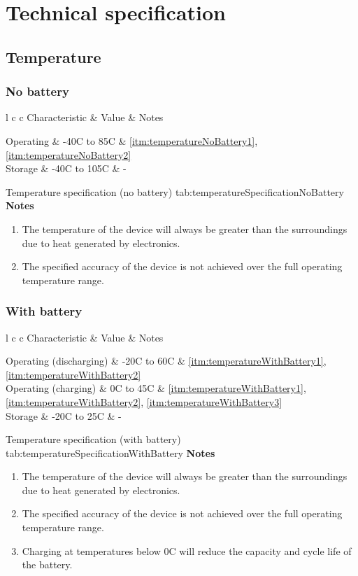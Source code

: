 \section{Technical specification}

\newcommand{\characteristicTable}[4]{
    \customTable
    {l c c}
    {Characteristic & Value & Notes}
    {
        #1
    }
    {#2}
    {#3}
    \textbf{Notes}
    \begin{enumerate}[nolistsep]
        #4
    \end{enumerate}
}

\subsection{Temperature}
\label{sec:temperature}

\newcommand{\noteHeatGenerated}{The temperature of the device will always be greater than the surroundings due to heat generated by electronics.}

\newcommand{\noteCalibrationTemperature}{The specified accuracy of the device is not achieved over the full operating temperature range.}%

\subsubsection{No battery}

\characteristicTable
{
    Operating & -40\textdegree{}C to 85\textdegree{}C & \ref{itm:temperatureNoBattery1}, \ref{itm:temperatureNoBattery2}\\
    Storage & -40\textdegree{}C to 105\textdegree{}C & -\\
}
{Temperature specification (no battery)}
{tab:temperatureSpecificationNoBattery}
{
    \item \label{itm:temperatureNoBattery1} \noteHeatGenerated
    \item \label{itm:temperatureNoBattery2} \noteCalibrationTemperature
}

\subsubsection{With battery}

\characteristicTable
{
    Operating (discharging) & -20\textdegree{}C to 60\textdegree{}C & \ref{itm:temperatureWithBattery1}, \ref{itm:temperatureWithBattery2}\\
    Operating (charging) & 0\textdegree{}C to 45\textdegree{}C & \ref{itm:temperatureWithBattery1}, \ref{itm:temperatureWithBattery2}, \ref{itm:temperatureWithBattery3}\\
    Storage & -20\textdegree{}C to 25\textdegree{}C & -\\
}
{Temperature specification (with battery)}
{tab:temperatureSpecificationWithBattery}
{
    \item \label{itm:temperatureWithBattery1} \noteHeatGenerated
    \item \label{itm:temperatureWithBattery2} \noteCalibrationTemperature
    \item \label{itm:temperatureWithBattery3} Charging at temperatures below 0\textdegree{}C will reduce the capacity and cycle life of the battery.
}

